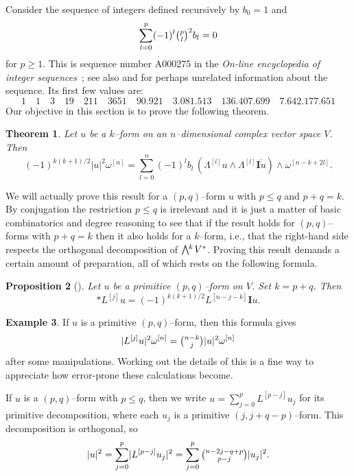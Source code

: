 \documentclass[11pt,a4paper]{amsart}
\def\^#1{^{[#1]}}
\def\bw#1{\bigwedge{}^{\mkern-5mu #1}\mkern2mu}
\def\I{\mathbf{I}}
\newtheorem{theo}{Theorem}[section]
\newtheorem{prop}[theo]{Proposition}
\theoremstyle{definition}
\newtheorem{exam}[theo]{Example}
\theoremstyle{remark}
\numberwithin{equation}{section}
\begin{document}
Consider the sequence of integers defined recursively by $b_0 = 1$ and
\begin{equation}
\label{bezel}
\sum_{l=0}^{p} (-1)^{l} \tbinom{p}{l}^2 b_l = 0
\end{equation}
for $p \geq 1$. This is sequence number A000275 in the \textsl{On-line
encyclopedia of integer sequences}~\cite{OEIS}; see also \cite{Carlitz}
and \cite{Riordan} for perhaps unrelated information about the sequence.
Its first few values are: 
$$
1 \quad 1 \quad 3 \quad 19 \quad 211 \quad 3651 \quad
90.921 \quad 3.081.513 \quad 136.407.699 \quad 7.642.177.651
$$
Our objective in this section is to prove the following theorem.


\begin{theo}
    \label{thm:norm}
Let $u$ be a $k$--form on an $n$--dimensional complex vector
space $V$. Then
$$
    (-1)^{k(k+1)/2}
    \lvert u \rvert^2 \omega\^n
    = \sum_{l=0}^n (-1)^{l} b_l \, 
    (\Lambda\^l u \wedge \Lambda\^l \overline{\I u})
    \wedge \omega\^{n-k+2l}.
$$
\end{theo}

We will actually prove this result for a $(p,q)$--form $u$ with $p \leq q$
and $p+q = k$. By conjugation the restriction $p \leq q$ is irrelevant and
it is just a matter of basic combinatorics and degree reasoning to see
that if the result holds for $(p,q)$--forms with $p + q = k$ then it also
holds for a $k$--form, i.e., that the right-hand side respects the
orthogonal decomposition of $\bw{k}V^*$.  Proving this result demands a
certain amount of preparation, all of which rests on the following formula.


\begin{prop}[{{\cite[Proposition~1.67]{Huy}}}]
Let $u$ be a primitive $(p,q)$--form on $V$. Set $k = p+q$. Then
$$
    * L\^{j} u = (-1)^{k(k+1)/2} L\^{n-j-k} \I u.
$$
\end{prop}


\begin{exam}
If $u$ is a primitive $(p,q)$--form, then this formula gives
$$
\lvert L\^{j} u \rvert^2 \omega\^{n}
= \tbinom{n-k}{j} \lvert u \rvert^2 \omega\^{n}
$$
after some manipulations. Working out the details of this is a fine way to
appreciate how error-prone these calculations become.
\end{exam}


If $u$ is a $(p,q)$--form with $p \leq q$, then we write $u =
\sum_{j=0}^p L\^{p-j} u_j$ for its primitive decomposition, where each
$u_j$ is a primitive $(j,j+q-p)$--form. This decomposition is
orthogonal, so
$$
\lvert u \rvert^2
= \sum_{j=0}^p \lvert L\^{p-j} u_j \rvert^2
= \sum_{j=0}^p \tbinom{n-2j-q+p}{p-j} \lvert u_j \rvert^2.
$$
\end{document}
